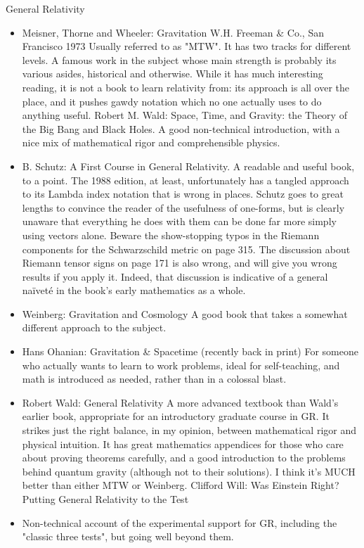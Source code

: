 \documentclass[10pt,a4paper]{book}
\theoremstyle{definition}
\begin{document}
General Relativity
\begin{itemize}
\item 
Meisner, Thorne and Wheeler: Gravitation W.H. Freeman \& Co., San Francisco 1973
Usually referred to as "MTW".  It has two tracks for different levels.  A famous work in the subject whose main strength is probably its various asides, historical and otherwise.  While it has much interesting reading, it is not a book to learn relativity from: its approach is all over the place, and it pushes gawdy notation which no one actually uses to do anything useful.
Robert M. Wald: Space, Time, and Gravity: the Theory of the Big Bang and Black Holes.
A good non-technical introduction, with a nice mix of mathematical rigor and comprehensible physics.
\item B. Schutz: A First Course in General Relativity.
A readable and useful book, to a point.  The 1988 edition, at least, unfortunately has a tangled approach to its Lambda index notation that is wrong in places.  Schutz goes to great lengths to convince the reader of the usefulness of one-forms, but is clearly unaware that everything he does with them can be done far more simply using vectors alone.  Beware the show-stopping typos in the Riemann components for the Schwarzschild metric on page 315.  The discussion about Riemann tensor signs on page 171 is also wrong, and will give you wrong results if you apply it.  Indeed, that discussion is indicative of a general naïveté in the book's early mathematics as a whole.
\item Weinberg: Gravitation and Cosmology
A good book that takes a somewhat different approach to the subject.
\item Hans Ohanian: Gravitation \& Spacetime (recently back in print)
For someone who actually wants to learn to work problems, ideal for self-teaching, and math is introduced as needed, rather than in a colossal blast.
\item Robert Wald: General Relativity
A more advanced textbook than Wald's earlier book, appropriate for an introductory graduate course in GR.  It strikes just the right balance, in my opinion, between mathematical rigor and physical intuition.  It has great mathematics appendices for those who care about proving theorems carefully, and a good introduction to the problems behind quantum gravity (although not to their solutions).  I think it's MUCH better than either MTW or Weinberg.
Clifford Will: Was Einstein Right? Putting General Relativity to the Test
\item Non-technical account of the experimental support for GR, including the "classic three tests", but going well beyond them.

\end{itemize}
\end{document}
